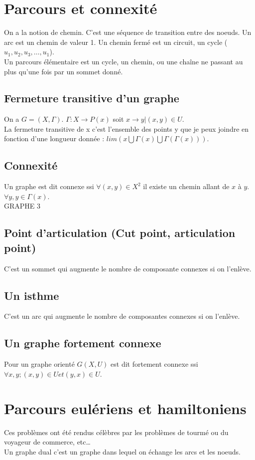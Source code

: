 \section{Parcours et connexité}
On a la notion de chemin. C'est une séquence de transition entre des noeuds. Un arc est un chemin de valeur 1.
Un chemin fermé est un circuit, un cycle ($u_1, u_2, u_3, \ldots, u_1$).\\
Un parcours élémentaire est un cycle, un chemin, ou une chaîne ne passant au plus qu'une fois par un sommet donné.\\
\subsection{Fermeture transitive d'un graphe}
On a $G=(X,\Gamma)$. $\Gamma : X \rightarrow P(x)$ soit $x \rightarrow {y|(x,y)\in U}.$\\
La fermeture transitive de x c'est l'ensemble des points y que je peux joindre en fonction d'une longueur donnée : $lim({x} \bigcup \Gamma(x) \bigcup \Gamma(\Gamma(x)))$.
\subsection{Connexité}
Un graphe est dit connexe ssi $\forall (x,y) \in X^2$ il existe un chemin allant de $x$ à $y$. $\forall y, y \in \Gamma(x)$.\\
GRAPHE 3\\
\subsection{Point d'articulation (Cut point, articulation point)}
C'est un sommet qui augmente le nombre de composante connexes si on l'enlève.
\subsection{Un isthme}
C'est un arc qui augmente le nombre de composantes connexes si on l'enlève.
\subsection{Un graphe fortement connexe}
Pour un graphe orienté $G(X,U)$ est dit fortement connexe ssi $\forall x,y; (x,y)\in U et (y,x)\in U$.

\section{Parcours eulériens et hamiltoniens}
Ces problèmes ont été rendus célèbres par les problèmes de tourmé ou du voyageur de commerce, etc\ldots\\
Un graphe dual c'est un graphe dans lequel on échange les arcs et les noeuds.
